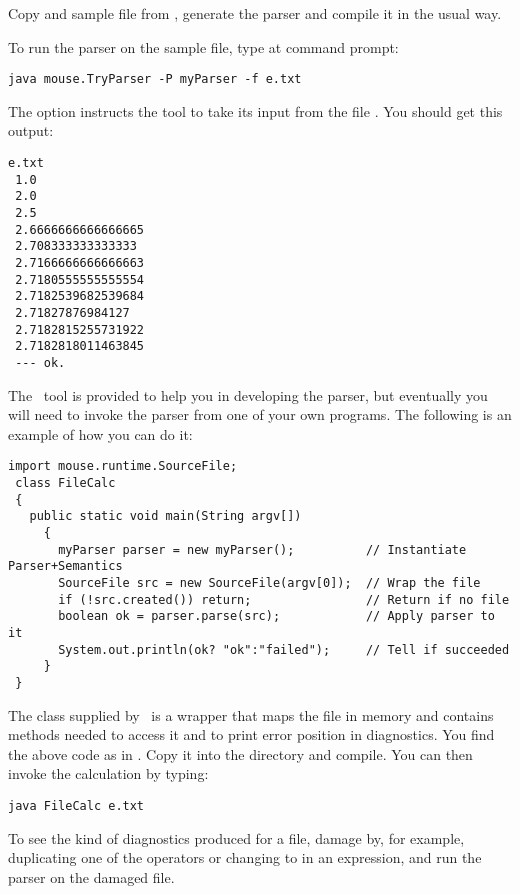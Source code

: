 Copy  and sample file  from ,
generate the parser and compile it in the usual way.

To run the parser on the sample file, type at command prompt:

\small
\begin{Verbatim}[samepage=true,xleftmargin=15mm,baselinestretch=0.8]
 java mouse.TryParser -P myParser -f e.txt
\end{Verbatim}
\normalsize

The option  instructs the tool to take its input from
the file .
You should get this output:

\small
\begin{Verbatim}[samepage=true,xleftmargin=15mm,baselinestretch=0.8]
 e.txt
 1.0
 2.0
 2.5
 2.6666666666666665
 2.708333333333333
 2.7166666666666663
 2.7180555555555554
 2.7182539682539684
 2.71827876984127
 2.7182815255731922
 2.7182818011463845
 --- ok.
\end{Verbatim}
\normalsize

The \Mouse\ tool  is provided to help you in developing the parser,
but eventually you will need to invoke the parser from one of your own programs.
The following is an example of how you can do it:

\medskip
\small
\begin{Verbatim}[frame=single,framesep=2mm,samepage=true,xleftmargin=6mm,xrightmargin=6mm,baselinestretch=0.8]
 import mouse.runtime.SourceFile;
 class FileCalc
 {
   public static void main(String argv[])
     {
       myParser parser = new myParser();          // Instantiate Parser+Semantics
       SourceFile src = new SourceFile(argv[0]);  // Wrap the file
       if (!src.created()) return;                // Return if no file
       boolean ok = parser.parse(src);            // Apply parser to it
       System.out.println(ok? "ok":"failed");     // Tell if succeeded
     }
 }
\end{Verbatim}
\normalsize

The class  supplied by \Mouse\ is a wrapper
that maps the file in memory 
and contains methods needed to access it and to
print error position in diagnostics.
You find the above code as  in .
Copy it into the  directory and compile.
You can then invoke the calculation by typing:

\small
\begin{Verbatim}[samepage=true,xleftmargin=15mm,baselinestretch=0.8]
 java FileCalc e.txt
\end{Verbatim}
\normalsize

To see the kind of diagnostics produced for a file, damage 
by, for example, duplicating one of the operators 
or changing  to  in an expression,
and run the parser on the damaged file.
